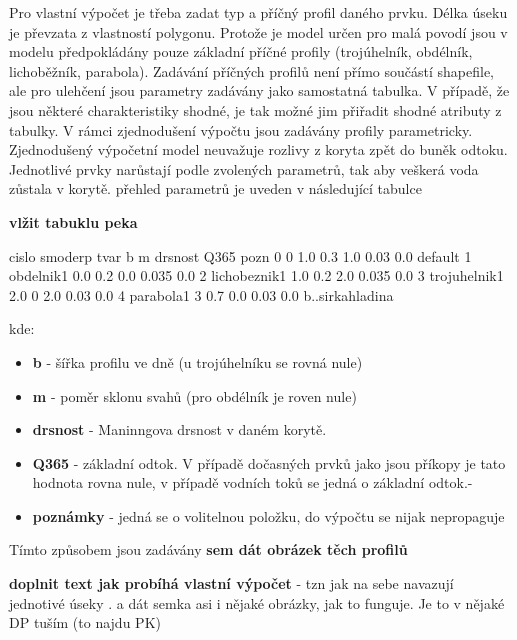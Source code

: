 

Pro vlastní výpočet je třeba zadat typ a příčný profil daného prvku. Délka úseku je převzata z vlastností polygonu. Protože je model určen pro malá povodí jsou v modelu předpokládány pouze základní příčné profily (trojúhelník, obdélník, lichoběžník, parabola). 
Zadávání příčných profilů není přímo součástí shapefile, ale pro ulehčení jsou parametry zadávány jako samostatná tabulka. V případě, že jsou některé charakteristiky shodné, je tak možné jim přiřadit shodné atributy z tabulky.
V rámci zjednodušení výpočtu jsou zadávány profily parametricky. Zjednodušený výpočetní model neuvažuje rozlivy z koryta zpět do buněk odtoku. Jednotlivé prvky narůstají podle zvolených parametrů, tak aby veškerá voda zůstala v korytě.
přehled parametrů je uveden v následující tabulce

\textbf{vlžit tabuklu peka}

cislo	smoderp	tvar	b	m	drsnost	Q365	pozn
0	0	1.0	0.3	1.0	0.03	0.0	default
1	obdelnik1	0.0	0.2	0.0	0.035	0.0
2	lichobeznik1	1.0	0.2	2.0	0.035	0.0
3	trojuhelnik1	2.0	0	2.0	0.03	0.0
4	parabola1	3	0.7	0.0	0.03	0.0	b..sirkahladina




kde:
\begin{itemize}
\item \textbf{b} - šířka profilu ve dně (u trojúhelníku se rovná nule)
\item \textbf{m} - poměr sklonu svahů (pro obdélník je roven nule)
\item \textbf{drsnost} - Maninngova drsnost v daném korytě.
\item \textbf{Q365} - základní odtok. V případě dočasných prvků jako jsou příkopy je tato hodnota rovna nule, v případě vodních toků se jedná o základní odtok.-
\item \textbf{poznámky} - jedná se o volitelnou položku, do výpočtu se nijak nepropaguje
\end{itemize}

Tímto způsobem jsou zadávány
\textbf{sem dát obrázek těch profilů}


\textbf{doplnit text jak probíhá vlastní výpočet} - tzn jak na sebe navazují jednotivé úseky . a dát semka asi i nějaké  obrázky, jak to funguje. Je to v nějaké DP tuším (to najdu PK)


